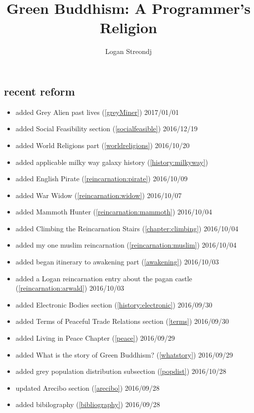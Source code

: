 \documentclass[10pt]{report}
\title{Green Buddhism: A Programmer's Religion}
\author{Logan Streondj \\
  \doclicenseName}
\begin{document}
\begin{titlepage}
\maketitle

\section{recent reform}
\begin{itemize}
  \item added Grey Alien past lives (\ref{greyMiner}) 2017/01/01
  \item added Social Feasibility section (\ref{socialfeasible}) 2016/12/19
  \item added World Religions part (\ref{worldreligions}) 2016/10/20
  \item added applicable milky way galaxy history (\ref{history:milkyway})
  \item added English Pirate (\ref{reincarnation:pirate}) 2016/10/09
  \item added War Widow (\ref{reincarnation:widow}) 2016/10/07
  \item added Mammoth Hunter (\ref{reincarnation:mammoth}) 2016/10/04
  \item added Climbing the Reincarnation Stairs (\ref{chapter:climbing})
2016/10/04
  \item added my one muslim reincarnation (\ref{reincarnation:muslim})
2016/10/04
  \item added began itinerary to awakening part (\ref{awakening}) 2016/10/03
  \item added a Logan reincarnation entry about the pagan castle
(\ref{reincarnation:arwald}) 2016/10/03
  \item added Electronic Bodies section (\ref{history:electronic}) 2016/09/30
  \item added Terms of Peaceful Trade Relations section (\ref{terms}) 2016/09/30
  \item added Living in Peace Chapter (\ref{peace}) 2016/09/29
  \item added What is the story of Green Buddhism? (\ref{whatstory}) 2016/09/29
  \item added grey population distribution subsection (\ref{popdist})
2016/10/28
 \item updated Arecibo section (\ref{arecibo}) 2016/09/28
 \item added bibilography (\ref{bibliography}) 2016/09/28
\end{itemize}
\end{titlepage}
\tableofcontents
 




\printbibliography{}
\label{bibliography}
\end{document}
